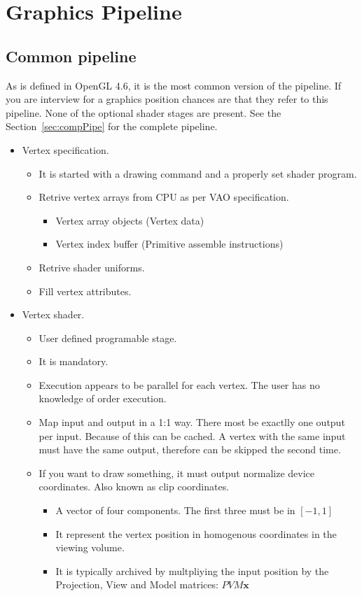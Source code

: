 \section{Graphics Pipeline}

\subsection{Common pipeline}
\label{sec:commPipe}

As is defined in OpenGL 4.6, it is the most common version of the pipeline.  If you are interview for a graphics position chances are that they refer to this pipeline. None of the  optional shader stages are present. See the Section~\ref{sec:compPipe} for the complete pipeline.

\begin{itemize}
 \item Vertex specification.
 \begin{itemize}
  \item It is started with a drawing command and a properly set shader program.
  \item Retrive vertex arrays from CPU as per VAO specification.
  \begin{itemize}
   \item Vertex array objects (Vertex data)
   \item Vertex index buffer (Primitive assemble instructions)
  \end{itemize}
  \item Retrive shader uniforms.
  \item Fill vertex attributes.
 \end{itemize}

 \item Vertex shader.
 \begin{itemize}
  \item User defined programable stage.
  \item It is mandatory.
  \item Execution appears to be parallel for each vertex. The user has no knowledge of order execution.
  \item Map input and output in a 1:1 way. There most be exactlly one output per input. Because of this can be cached. A vertex with the same input must have the same output, therefore can be skipped the second time.
  \item If you want to draw something, it must output normalize device coordinates. Also known as clip coordinates. 
  \begin{itemize}
   \item A vector of four components. The first three must be in $[-1, 1]$
   \item It represent the vertex position in homogenous coordinates in the viewing volume.
   \item It is typically archived by multpliying the input position by the Projection, View and Model matrices: $P V M\mathbf{x}$
  \end{itemize}


\end{itemize}
\end{itemize}
